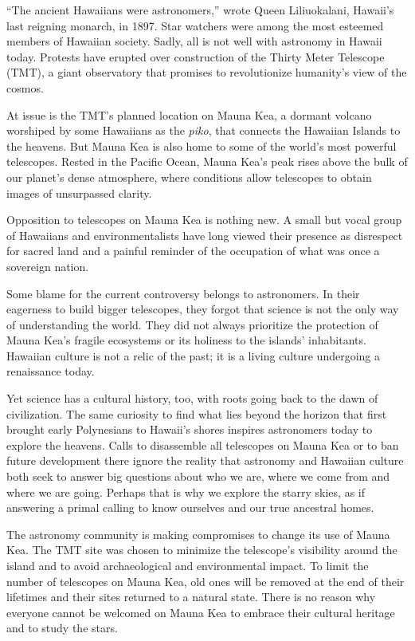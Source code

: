 ``The ancient Hawaiians were astronomers,'' wrote Queen Liliuokalani,
Hawaii's last reigning monarch, in 1897. Star watchers were among the
most esteemed members of Hawaiian society. Sadly, all is not well with
astronomy in Hawaii today. Protests have erupted over construction of
the Thirty Meter Telescope (TMT), a giant observatory that promises to
revolutionize humanity's view of the cosmos.

At issue is the TMT's planned location on Mauna Kea, a dormant volcano
worshiped by some Hawaiians as the \emph{piko}, that connects the
Hawaiian Islands to the heavens. But Mauna Kea is also home to some of
the world's most powerful telescopes. Rested in the Pacific Ocean,
Mauna Kea's peak rises above the bulk of our planet's dense atmosphere,
where conditions allow telescopes to obtain images of unsurpassed
clarity.

Opposition to telescopes on Mauna Kea is nothing new. A small but
vocal group of Hawaiians and environmentalists have long viewed their
presence as disrespect for sacred land and a painful reminder of the
occupation of what was once a sovereign nation.

Some blame for the current controversy belongs to astronomers. In
their eagerness to build bigger telescopes, they forgot that science is
not the only way of understanding the world. They did not always
prioritize the protection of Mauna Kea's fragile ecosystems or its
holiness to the islands' inhabitants. Hawaiian culture is not a relic
of the past; it is a living culture undergoing a renaissance today.

Yet science has a cultural history, too, with roots going back to the
dawn of civilization. The same curiosity to find what lies beyond the
horizon that first brought early Polynesians to Hawaii's shores inspires
astronomers today to explore the heavens. Calls to disassemble all
telescopes on Mauna Kea or to ban future development there ignore the
reality that astronomy and Hawaiian culture both seek to answer big
questions about who we are, where we come from and where we are going.
Perhaps that is why we explore the starry skies, as if answering a
primal calling to know ourselves and our true ancestral homes.

The astronomy community is making compromises to change its use of
Mauna Kea. The TMT site was chosen to minimize the telescope's
visibility around the island and to avoid archaeological and
environmental impact. To limit the number of telescopes on Mauna Kea,
old ones will be removed at the end of their lifetimes and their sites
returned to a natural state. There is no reason why everyone cannot be
welcomed on Mauna Kea to embrace their cultural heritage and to study
the stars.

